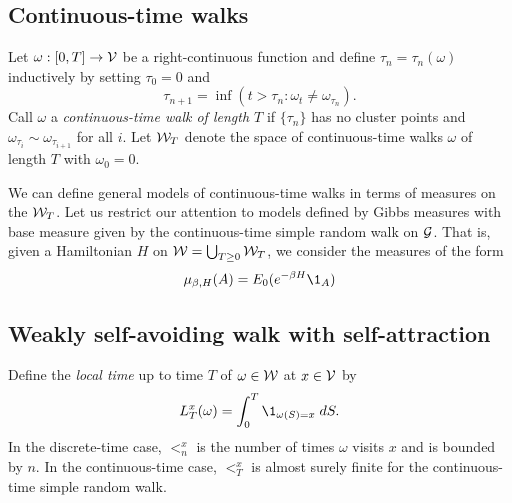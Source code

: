 
\subsection{Continuous-time walks}

Let $\omega : [0, T] \rightarrow \mathcal{V}$ be a right-continuous function and define
$\tau_n = \tau_n(\omega)$ inductively by setting $\tau_0 = 0$ and
\begin{equation}
\tau_{n+1} = \inf (t > \tau_n : \omega_t \ne \omega_{\tau_n}).
\end{equation}
Call $\omega$ a \emph{continuous-time walk of length $T$} if $\{ \tau_n \}$
has no cluster points and $\omega_{\tau_i} \sim \omega_{\tau_{i+1}}$ for all $i$.
Let $\mathcal{W}_T$ denote the space of continuous-time walks $\omega$ of length $T$
with $\omega_0 = 0$.

We can define general models of continuous-time walks in terms of measures on
the $\mathcal{W}_T$. Let us restrict our attention to models defined by Gibbs measures
with base measure given by the continuous-time simple random walk on $\mathcal{G}$.
That is, given a Hamiltonian $H$ on $\mathcal{W} = \bigcup_{T \ge 0} \mathcal{W}_T$,
we consider the measures of the form
\begin{equation}
\mu_{\beta,H}(A) = E_0 (e^{-\beta H} \1_A)
\end{equation}


\subsection{Weakly self-avoiding walk with self-attraction}

Define the \emph{local time} up to time $T$ of $\omega \in \mathcal{W}$ at
$x \in \mathcal{V}$ by
\begin{equation}
\label{e:LTx-def}
\lt^x_T(\omega) = \int_0^T \1_{\omega(S)=x} \; dS.
\end{equation}
In the discrete-time case, $\lt^x_n$ is the number of times $\omega$ visits $x$
and is bounded by $n$. In the continuous-time case, $\lt^x_T$ is almost surely
finite for the continuous-time simple random walk.

